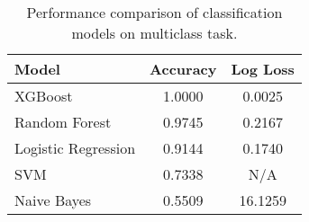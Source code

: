 \begin{table}
\caption{Performance comparison of classification models on multiclass task.}
\label{tab:model_comparison}
\begin{tabular}{lcc}
\toprule
Model & Accuracy & Log Loss \\
\midrule
XGBoost & 1.0000 & 0.0025 \\
Random Forest & 0.9745 & 0.2167 \\
Logistic Regression & 0.9144 & 0.1740 \\
SVM & 0.7338 & N/A \\
Naive Bayes & 0.5509 & 16.1259 \\
\bottomrule
\end{tabular}
\end{table}
